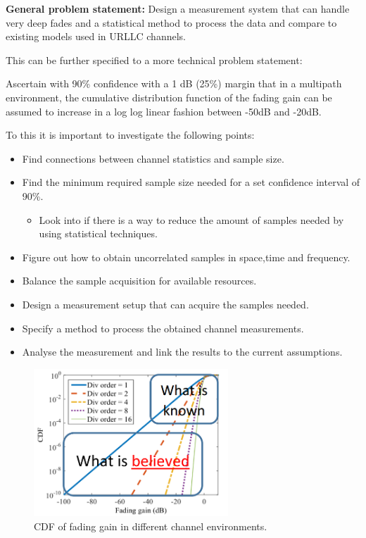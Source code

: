 \textbf{General problem statement:}
Design a measurement system that can handle very deep fades and a statistical method to process the data and compare to existing models used in URLLC channels.

This can be further specified to a more technical problem statement: 

Ascertain with 90\% confidence with a 1 dB (25\%) margin that in a multipath environment, the cumulative distribution function of the fading gain can be assumed to increase in a log log linear fashion between -50dB and -20dB.

To this it is important to investigate the following points: 

\begin{itemize}
	\item Find connections between channel statistics and sample size.
	\item Find the minimum required sample size needed for a set confidence interval of 90\%.
	\begin{itemize}
	\item Look into if there is a way to reduce the amount of samples needed by using statistical techniques.
 	\end{itemize}
	\item Figure out how to obtain uncorrelated samples in space,time and frequency.
	\item Balance the sample acquisition for available resources. 
	\item Design  a measurement setup that can acquire the samples needed.
	\item Specify a method to process the obtained channel measurements.
	\item Analyse the measurement and link the results to the current assumptions.
\end{itemize}

\begin{figure}[H]
\centering
\includegraphics[width=0.65\textwidth]{figures/fading_gain.png}
\caption{\Gls{CDF} of fading gain in different channel environments.}
\label{fading_gain}
\end{figure}




